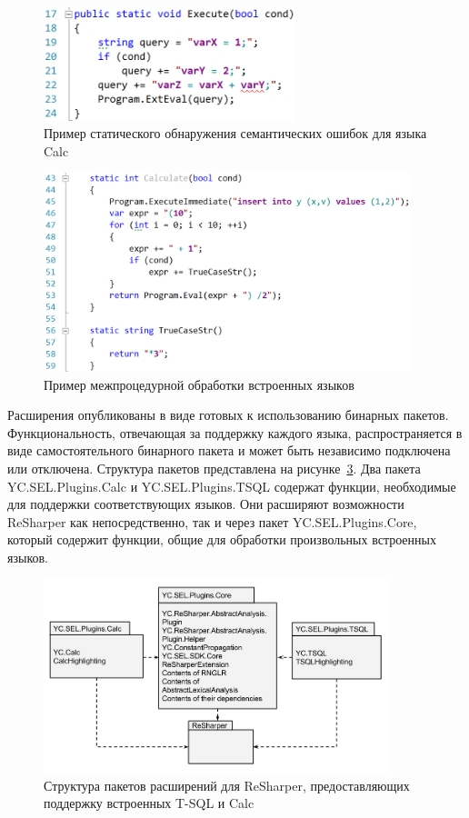 \begin{figure}[H]
  \centering
 \includegraphics[width=0.65\textwidth]{pics/undefined_variable.png}
 \caption{Пример статического обнаружения семантических ошибок для языка Calc}
 \label{fig:undeclaredVars}
\end{figure}

\begin{figure}[H]
  \centering
 \includegraphics[width=0.95\textwidth]{pics/sql_calc_cycle.png}
 \caption{Пример межпроцедурной обработки встроенных языков}
 \label{fig:interProc}
\end{figure}

Расширения опубликованы в виде готовых к использованию бинарных пакетов. Функциональность, отвечающая за поддержку каждого языка, распространяется в виде самостоятельного бинарного пакета и может быть независимо подключена или отключена. Структура пакетов представлена на рисунке~\ref{fig:packagesStructure}. Два пакета YC.SEL.Plugins.Calc и YC.SEL.Plugins.TSQL содержат функции, необходимые для поддержки соответствующих языков. Они расширяют возможности ReSharper как непосредственно, так и через пакет YC.SEL.Plugins.Core, который содержит функции, общие для обработки произвольных встроенных языков.

\begin{figure}[H]
  \centering
 \includegraphics[width=0.90\textwidth]{pics/RshPluginsPackages.png}
 \caption{Структура пакетов расширений для ReSharper, предоставляющих поддержку встроенных T-SQL и Calc}
 \label{fig:packagesStructure}
\end{figure}

